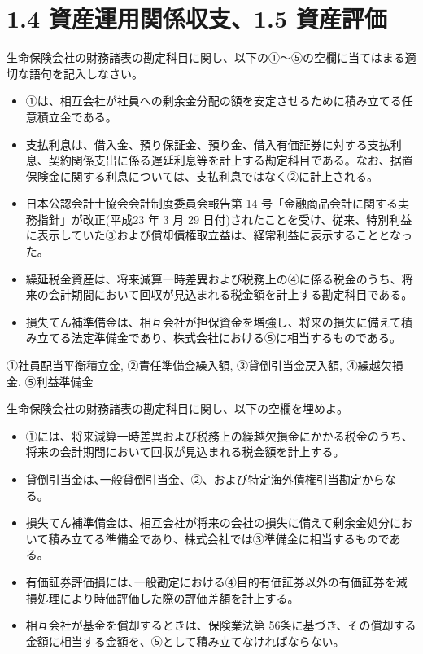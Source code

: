 \documentclass[report,gutter=10mm,fore-edge=10mm,uplatex,dvipdfmx]{jlreq}
\begin{document}
\section{1.4 資産運用関係収支、1.5
資産評価}


生命保険会社の財務諸表の勘定科目に関し、以下の①～⑤の空欄に当てはまる適切な語句を記入しなさい。
\begin{itemize}
 \item ①は、相互会社が社員への剰余金分配の額を安定させるために積み立てる任意積立金である。
\item 支払利息は、借入金、預り保証金、預り金、借入有価証券に対する支払利息、契約関係支出に係る遅延利息等を計上する勘定科目である。なお、据置保険金に関する利息については、支払利息ではなく②に計上される。
\item 日本公認会計士協会会計制度委員会報告第 14 号「金融商品会計に関する実務指針」が改正(平成23 年 3 月 29 日付)されたことを受け、従来、特別利益に表示していた③および償却債権取立益は、経常利益に表示することとなった。
\item 繰延税金資産は、将来減算一時差異および税務上の④に係る税金のうち、将来の会計期間において回収が見込まれる税金額を計上する勘定科目である。
\item 損失てん補準備金は、相互会社が担保資金を増強し、将来の損失に備えて積み立てる法定準備金であり、株式会社における⑤に相当するものである。
\end{itemize}



①社員配当平衡積立金, ②責任準備金繰入額, ③貸倒引当金戻入額, ④繰越欠損金,
⑤利益準備金


生命保険会社の財務諸表の勘定科目に関し、以下の空欄を埋めよ。

\begin{itemize}
\item ①には、将来減算一時差異および税務上の繰越欠損金にかかる税金のうち、将来の会計期間において回収が見込まれる税金額を計上する。
\item 貸倒引当金は､一般貸倒引当金、②、および特定海外債権引当勘定からなる。
\item 損失てん補準備金は、相互会社が将来の会社の損失に備えて剰余金処分において積み立てる準備金であり、株式会社では③準備金に相当するものである。
\item 有価証券評価損には､一般勘定における④目的有価証券以外の有価証券を減損処理により時価評価した際の評価差額を計上する。
\item 相互会社が基金を償却するときは、保険業法第 56条に基づき、その償却する金額に相当する金額を、⑤として積み立てなければならない。
\end{itemize}
\end{document}
